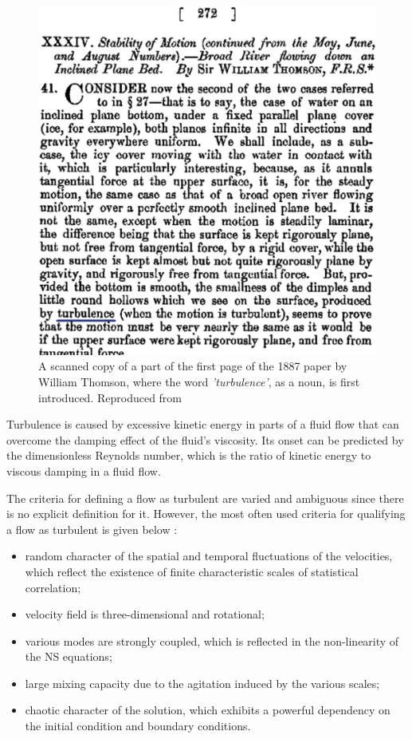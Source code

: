 \begin{figure}[htbp!]
    \centering
    \includegraphics{Figures/research_papers/schmitt2017turbulence-fig-1.jpg}
    \caption{A scanned copy of a part of the first page of the 1887 paper by William Thomson, where the word \textit{'turbulence'}, as a noun, is first introduced. Reproduced from \cite{schmitt2017turbulence}}
    \label{fig:schmitt2017turbulence-fig-1}
\end{figure}

Turbulence is caused by excessive kinetic energy in parts of a fluid flow that can overcome the damping effect of the fluid's viscosity. Its onset can be predicted by the dimensionless Reynolds number, which is the ratio of kinetic energy to viscous damping in a fluid flow. 

The criteria for defining a flow as turbulent are varied and ambiguous since there is no explicit definition for it. However, the most often used criteria for qualifying a flow as turbulent is given below \parencite{sagaut2002statistical}:
\begin{itemize}
    \item random character of the spatial and temporal fluctuations of the velocities, which reflect the existence of finite characteristic scales of statistical correlation;
    \item velocity field is three-dimensional and rotational;
    \item various modes are strongly coupled, which is reflected in the non-linearity of the NS equations;
    \item large mixing capacity due to the agitation induced by the various scales;
    \item chaotic character of the solution, which exhibits a powerful dependency on the initial condition and boundary conditions.
\end{itemize}


